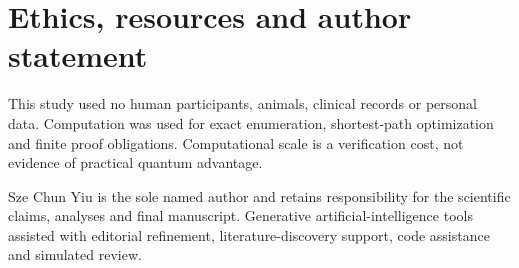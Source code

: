 \section*{Ethics, resources and author statement}

This study used no human participants, animals, clinical records or personal data.  Computation was used for exact enumeration, shortest-path optimization and finite proof obligations.  Computational scale is a verification cost, not evidence of practical quantum advantage.

Sze Chun Yiu is the sole named author and retains responsibility for the scientific claims, analyses and final manuscript.  Generative artificial-intelligence tools assisted with editorial refinement, literature-discovery support, code assistance and simulated review.
